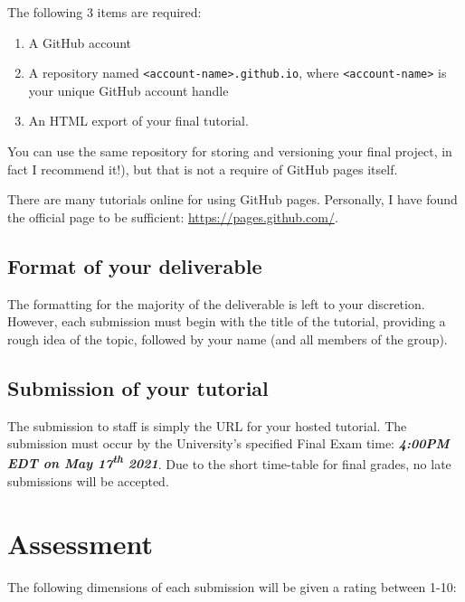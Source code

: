 \documentclass{article}
\begin{document}
The following 3 items are required:

\begin{enumerate}
  \item A GitHub account
  \item A repository named \verb`<account-name>.github.io`, where
        \verb`<account-name>` is your unique GitHub account handle
  \item An HTML export of your final tutorial.
\end{enumerate}

You can use the same repository for storing and versioning your final project,
in fact I recommend it!), but that is not a require of GitHub pages itself.

There are many tutorials online for using GitHub pages. Personally, I have found
the official page to be sufficient: \url{https://pages.github.com/}.

\subsection{Format of your deliverable}

The formatting for the majority of the deliverable is left to your discretion.
However, each submission must begin with the title of the tutorial, providing a
rough idea of the topic, followed by your name (and all members of the group).

\subsection{Submission of your tutorial}

The submission to staff is simply the URL for your hosted tutorial. The
submission must occur by the University's specified Final Exam time:
\textbf{\textit{4:00PM EDT on May 17\textsuperscript{th} 2021}}. Due to the
short time-table for final grades, no late submissions will be accepted.


\section{Assessment}

The following dimensions of each submission will be given a rating between 1-10:
\end{document}
